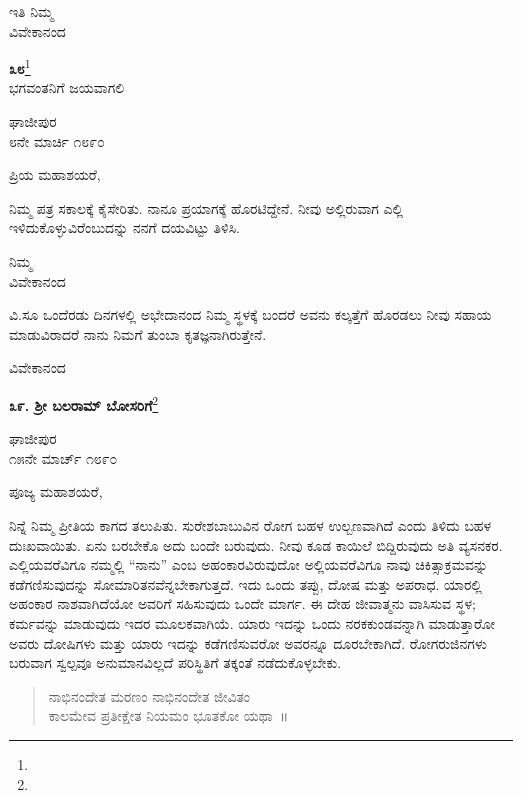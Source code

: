 {\flushright
ಇತಿ ನಿಮ್ಮ\\ವಿವೇಕಾನಂದ\par}

\begin{center}
\textbf{೩೮}\footnote{}\\ ಭಗವಂತನಿಗೆ ಜಯವಾಗಲಿ
\end{center}

\vspace{-0.5cm}

\begin{flushright}
ಘಾಜೀಪುರ\\೮ನೇ ಮಾರ್ಚಿ ೧೮೯೦
\end{flushright}

\noindent
ಪ್ರಿಯ ಮಹಾಶಯರೆ,

ನಿಮ್ಮ ಪತ್ರ ಸಕಾಲಕ್ಕೆ ಕೈಸೇರಿತು. ನಾನೂ ಪ್ರಯಾಗಕ್ಕೆ ಹೊರಟಿದ್ದೇನೆ. ನೀವು ಅಲ್ಲಿರುವಾಗ ಎಲ್ಲಿ ಇಳಿದುಕೊಳ್ಳುವಿರೆಂಬುದನ್ನು ನನಗೆ ದಯವಿಟ್ಟು ತಿಳಿಸಿ.

\vspace{-0.5cm}

{\flushright
ನಿಮ್ಮ\\ವಿವೇಕಾನಂದ\par}

ವಿ.ಸೂ \enginline{-}ಒಂದೆರಡು ದಿನಗಳಲ್ಲಿ ಅಭೇದಾನಂದ ನಿಮ್ಮ ಸ್ಥಳಕ್ಕೆ ಬಂದರೆ ಅವನು ಕಲ್ಕತ್ತೆಗೆ ಹೊರಡಲು ನೀವು ಸಹಾಯ ಮಾಡುವಿರಾದರೆ ನಾನು ನಿಮಗೆ ತುಂಬಾ ಕೃತಜ್ಞನಾಗಿರುತ್ತೇನೆ.

\vspace{-0.5cm}

{\flushright
ವಿವೇಕಾನಂದ\par}

\begin{center}
\textbf{೩೯. ಶ‍್ರೀ ಬಲರಾಮ್ ಬೋಸರಿಗೆ}\footnote{}
\end{center}

\vspace{-0.5cm}

\begin{flushright}
ಘಾಜೀಪುರ\\೧೫ನೇ ಮಾರ್ಚ್ ೧೮೯೦
\end{flushright}

\noindent
ಪೂಜ್ಯ ಮಹಾಶಯರೆ,

ನಿನ್ನೆ ನಿಮ್ಮ ಪ್ರೀತಿಯ ಕಾಗದ ತಲುಪಿತು. ಸುರೇಶಬಾಬುವಿನ ರೋಗ ಬಹಳ ಉಲ್ಬಣವಾಗಿದೆ ಎಂದು ತಿಳಿದು ಬಹಳ ದುಃಖವಾಯಿತು. ಏನು ಬರಬೇಕೊ ಅದು ಬಂದೇ ಬರುವುದು. ನೀವು ಕೂಡ ಕಾಯಿಲೆ ಬಿದ್ದಿರುವುದು ಅತಿ ವ್ಯಸನಕರ. ಎಲ್ಲಿಯವರೆವಿಗೂ ನಮ್ಮಲ್ಲಿ “ನಾನು” ಎಂಬ ಅಹಂಕಾರವಿರುವುದೋ ಅಲ್ಲಿಯವರೆವಿಗೂ ನಾವು ಚಿಕಿತ್ಸಾಕ್ರಮವನ್ನು ಕಡೆಗಣಿಸುವುದನ್ನು ಸೋಮಾರಿತನವೆನ್ನಬೇಕಾಗುತ್ತದೆ. ಇದು ಒಂದು ತಪ್ಪು, ದೋಷ ಮತ್ತು ಅಪರಾಧ. ಯಾರಲ್ಲಿ ಅಹಂಕಾರ ನಾಶವಾಗಿದೆಯೋ ಅವರಿಗೆ ಸಹಿಸುವುದು ಒಂದೇ ಮಾರ್ಗ. ಈ ದೇಹ ಜೀವಾತ್ಮನು ವಾಸಿಸುವ ಸ್ಥಳ; ಕರ್ಮವನ್ನು ಮಾಡುವುದು ಇದರ ಮೂಲಕವಾಗಿಯೆ. ಯಾರು ಇದನ್ನು ಒಂದು ನರಕಕುಂಡವನ್ನಾಗಿ ಮಾಡುತ್ತಾರೋ ಅವರು ದೋಷಿಗಳು ಮತ್ತು ಯಾರು ಇದನ್ನು ಕಡೆಗಣಿಸುವರೋ ಅವರನ್ನೂ ದೂರಬೇಕಾಗಿದೆ. ರೋಗರುಜಿನಗಳು ಬರುವಾಗ ಸ್ವಲ್ಪವೂ ಅನುಮಾನವಿಲ್ಲದೆ ಪರಿಸ್ಥಿತಿಗೆ ತಕ್ಕಂತೆ ನಡೆದುಕೊಳ್ಳಬೇಕು.
\begin{verse}
 ನಾಭಿನಂದೇತ ಮರಣಂ ನಾಭಿನಂದೇತ ಜೀವಿತಂ\\
 ಕಾಲಮೇವ ಪ್ರತೀಕ್ಷೇತ ನಿಯಮಂ ಭೂತಕೋ ಯಥಾ~॥ 
\end{verse}


